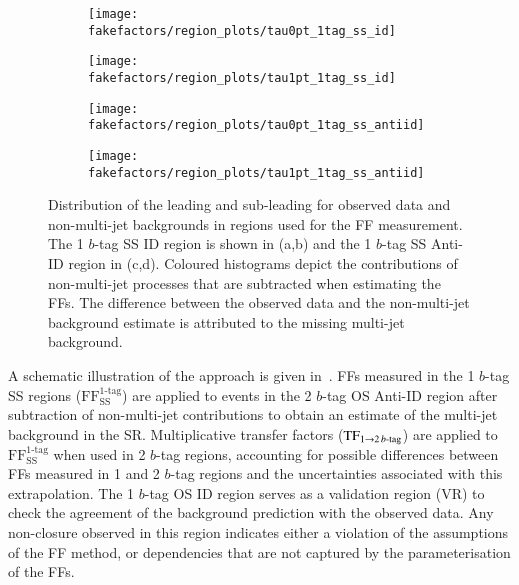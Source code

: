 \begin{figure}[htbp]
  \centering

  \begin{subfigure}{0.49\textwidth}
    \texttt{[image: fakefactors/region\_plots/tau0pt\_1tag\_ss\_id]}
  \end{subfigure}
  \begin{subfigure}{0.49\textwidth}
    \texttt{[image: fakefactors/region\_plots/tau1pt\_1tag\_ss\_id]}
  \end{subfigure}

  \begin{subfigure}{0.49\textwidth}
    \texttt{[image: fakefactors/region\_plots/tau0pt\_1tag\_ss\_antiid]}
  \end{subfigure}
  \begin{subfigure}{0.49\textwidth}
    \texttt{[image: fakefactors/region\_plots/tau1pt\_1tag\_ss\_antiid]}
  \end{subfigure}

  \caption[Distribution of the leading and sub-leading \tauhadvis \pT for
  observed data and non-multi-jet backgrounds in regions used for the FF
  measurement.]{Distribution of the leading and sub-leading \tauhadvis \pT for
    observed data and non-multi-jet backgrounds in regions used for the FF
    measurement. The 1 $b$-tag SS ID region is shown in (a,b) and the 1 $b$-tag
    SS Anti-ID region in (c,d). Coloured histograms depict the contributions of
    non-multi-jet processes that are subtracted when estimating the FFs. The
    difference between the observed data and the non-multi-jet background
    estimate is attributed to the missing multi-jet background.}%
  \label{fig:mjfakes_1tag_ss_plots}
\end{figure}

A schematic illustration of the approach is given
in~. FFs measured in the 1 $b$-tag SS regions
($\text{FF}_\text{SS}^\text{1-tag}$) are applied to events in the 2 $b$-tag OS
Anti-ID region after subtraction of non-multi-jet contributions to obtain an
estimate of the multi-jet background in the SR. Multiplicative transfer factors
($\text{TF}_{1 \rightarrow 2\,b\text{-tag}}$) are applied to
$\text{FF}_\text{SS}^\text{1-tag}$ when used in 2 $b$-tag regions, accounting
for possible differences between FFs measured in 1 and 2 $b$-tag regions and the
uncertainties associated with this extrapolation. The 1 $b$-tag OS ID region
serves as a validation region (VR) to check the agreement of the background
prediction with the observed data. Any non-closure observed in this region
indicates either a violation of the assumptions of the FF method, or
dependencies that are not captured by the parameterisation of the FFs.

